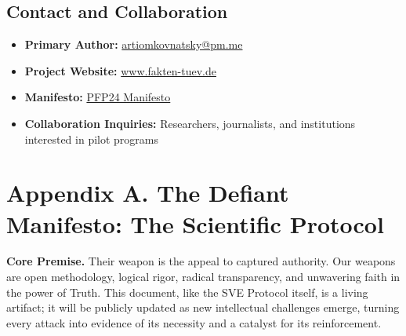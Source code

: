 \documentclass[11pt,a4paper]{article}
\begin{document}
\begin{small}
\subsection*{Contact and Collaboration}
\begin{itemize}[leftmargin=*]
    \item \textbf{Primary Author:} \href{mailto:artiomkovnatsky@pm.me}{artiomkovnatsky@pm.me}
    \item \textbf{Project Website:} \href{http://www.fakten-tuev.de}{www.fakten-tuev.de}
    \item \textbf{Manifesto:} \href{https://drive.google.com/file/d/1vWhW7fwFRFLYKHEB67WixuueHssJzQbZ/view?usp=sharing}{PFP24 Manifesto}
    \item \textbf{Collaboration Inquiries:} Researchers, journalists, and institutions interested in pilot programs
\end{itemize}

\clearpage %



\section*{Appendix A. The Defiant Manifesto: The Scientific Protocol}
\label{app:manifesto}

\vspace{1em}

\noindent{}

\vspace{1.5em}

\noindent\textbf{\textcolor{headercolor}{Core Premise.}} Their weapon is the appeal to captured authority. Our weapons are open methodology, logical rigor, radical transparency, and unwavering faith in the power of Truth. This document, like the SVE Protocol itself, is a living artifact; it will be publicly updated as new intellectual challenges emerge, turning every attack into evidence of its necessity and a catalyst for its reinforcement.


\end{small}
\end{document}
